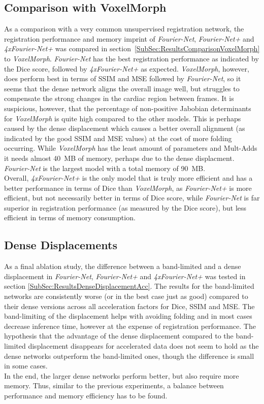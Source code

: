 \subsection{Comparison with VoxelMorph} \label{SubSec:DiscussionComparisonVoxelMorph}
As a comparison with a very common unsupervised registration network, the registration performance and memory imprint of \emph{Fourier-Net}, \emph{Fourier-Net+} and \emph{4xFourier-Net+} was compared in section~\ref{SubSec:ResultsComparisonVoxelMorph} to \emph{VoxelMorph}. \emph{Fourier-Net} has the best registration performance as indicated by the Dice score, followed by \emph{4xFourier-Net+} as expected. \emph{VoxelMorph}, however, does perform best in terms of SSIM and MSE followed by \emph{Fourier-Net}, so it seems that the dense network aligns the overall image well, but struggles to compensate the strong changes in the cardiac region between frames. It is suspicious, however, that the percentage of non-positive Jabobian determinants for \emph{VoxelMorph} is quite high compared to the other models. This is perhaps caused by the dense displacement which causes a better overall alignment (as indicated by the good SSIM and MSE values) at the cost of more folding occurring. While \emph{VoxelMorph} has the least amount of parameters and Mult-Adds it needs almost 40~MB of memory, perhaps due to the dense displacment. \emph{Fourier-Net} is the largest model with a total memory of 90~MB. \\
Overall, \emph{4xFourier-Net+} is the only model that is truly more efficient and has a better performance in terms of Dice than \emph{VoxelMorph}, as \emph{Fourier-Net+} is more efficient, but not necessarily better in terms of Dice score, while \emph{Fourier-Net} is far superior in registration performance (as measured by the Dice score), but less efficient in terms of memory consumption.

\subsection{Dense Displacements} \label{SubSec:DiscussionDenseDisplacements}
As a final ablation study, the difference between a band-limited and a dense displacement in \emph{Fourier-Net}, \emph{Fourier-Net+} and \emph{4xFourier-Net+} was tested in section \ref{SubSec:ResultsDenseDisplacementAcc}. The results for the band-limited networks are consistently worse (or in the best case just as good) compared to their dense versions across all acceleration factors for Dice, SSIM and MSE. The band-limiting of the displacement helps with avoiding folding and in most cases decrease inference time, however at the expense of registration performance. The hypothesis that the advantage of the dense displacement compared to the band-limited displacement disappears for accelerated data does not seem to hold as the dense networks outperform the band-limited ones, though the difference is small in some cases. \\
In the end, the larger dense networks perform better, but also require more memory. Thus, similar to the previous experiments, a balance between performance and memory efficiency has to be found.

